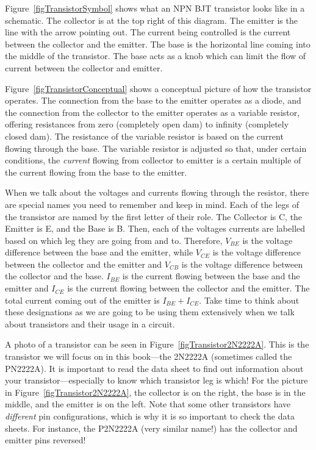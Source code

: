 Figure~\ref{figTransistorSymbol} shows what an NPN BJT transistor looks like in a schematic.
The collector is at the top right of this diagram.  
The emitter is the line with the arrow pointing out.
The current being controlled is the current between the collector and the emitter.
The base is the horizontal line coming into the middle of the transistor.
The base acts as a knob which can limit the flow of current between the collector and emitter.

Figure~\ref{figTransistorConceptual} shows a conceptual picture of how the transistor operates.
The connection from the base to the emitter operates as a diode, and the connection from the collector to the emitter operates as a variable resistor, offering resistances from zero (completely open dam) to infinity (completely closed dam).
The resistance of the variable resistor is based on the current flowing through the base.
The variable resistor is adjusted so that, under certain conditions, the \emph{current} flowing from collector to emitter is a certain multiple of the current flowing from the base to the emitter.


When we talk about the voltages and currents flowing through the resistor, there are special names you need to remember and keep in mind.
Each of the legs of the transistor are named by the first letter of their role.
The Collector is C, the Emitter is E, and the Base is B.
Then, each of the voltages currents are labelled based on which leg they are going from and to.
Therefore, $V_{BE}$ is the voltage difference between the base and the emitter, while $V_{CE}$ is the voltage difference between the collector and the emitter and $V_{CB}$ is the voltage difference between the collector and the base.
$I_{BE}$ is the current flowing between the base and the emitter and $I_{CE}$ is the current flowing between the collector and the emitter.
The total current coming out of the emitter is $I_{BE} + I_{CE}$.
Take time to think about these designations as we are going to be using them extensively when we talk about transistors and their usage in a circuit.


A photo of a transistor can be seen in Figure~\ref{figTransistor2N2222A}.
This is the transistor we will focus on in this book---the 2N2222A (sometimes called the PN2222A).
It is important to read the data sheet to find out information about your transistor---especially to know which transistor leg is which!
For the picture in Figure~\ref{figTransistor2N2222A}, the collector is on the right, the base is in the middle, and the emitter is on the left.
Note that some other transistors have \emph{different} pin configurations, which is why it is so important to check the data sheets.  
For instance, the P2N2222A (very similar name!) has the collector and emitter pins reversed!

